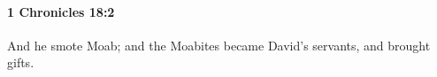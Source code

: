 
		\paragraph{1 Chronicles 18:2} %
			\label{1CHRONICLES-18-2}

			And he smote Moab; and the Moabites became David’s servants, and brought gifts.


